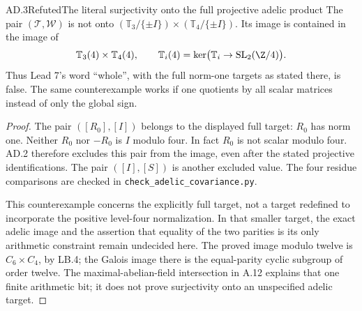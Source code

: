 \begin{statement}{AD.3}{Refuted}{The literal surjectivity onto the full projective adelic product}
The pair $(\mathcal T,\mathcal W)$ is not onto
$(\mathbb T_3/\{\pm I\})\times(\mathbb T_4/\{\pm I\})$.
Its image is contained in the image of
\[
 \mathbb T_3(4)\times\mathbb T_4(4),\qquad
 \mathbb T_i(4)=\ker\bigl(\mathbb T_i\to
                           \mathrm{SL}_2(\Z/4)\bigr).
\]
Thus Lead 7's word ``whole'', with the full norm-one targets
as stated there, is false. The same counterexample works
if one quotients by all scalar matrices instead of only the
global sign.
\end{statement}
\begin{proof}
The pair $([R_0],[I])$ belongs to the displayed full target:
$R_0$ has norm one. Neither $R_0$ nor $-R_0$ is $I$ modulo
four. In fact $R_0$ is not scalar modulo four. AD.2 therefore
excludes this pair from the image, even after the stated
projective identifications. The pair $([I],[S])$ is another
excluded value. The four residue comparisons are checked
in \texttt{check\_adelic\_covariance.py}.

This counterexample concerns the explicitly full target, not
a target redefined to incorporate the positive level-four
normalization. In that smaller target, the exact adelic
image and the assertion that equality of the two parities
is its only arithmetic constraint remain undecided here.
The proved image modulo twelve is $C_6\times C_4$, by LB.4;
the Galois image there is the equal-parity cyclic subgroup
of order twelve. The maximal-abelian-field intersection in
A.12 explains that one finite arithmetic bit; it does not
prove surjectivity onto an unspecified adelic target.
\end{proof}
